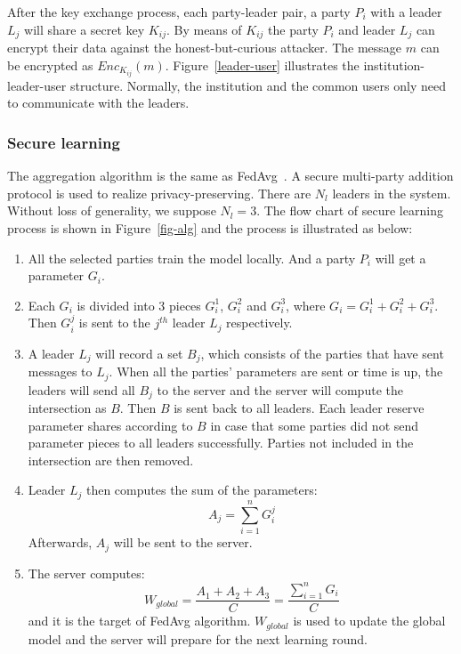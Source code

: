 After the key exchange process, each party-leader pair, a party $P_i$ with a leader $L_j$ will share a secret key $K_{ij}$. By means of $K_{ij}$ the party $P_i$ and leader $L_j$ can encrypt their data against the honest-but-curious attacker. The message $m$ can be encrypted as $Enc_{K_{ij}}(m)$. Figure~\ref{leader-user} illustrates the institution-leader-user structure. Normally, the institution and the common users only need to communicate with the leaders.

\subsubsection{\textbf{Secure learning}}
The aggregation algorithm is the same as FedAvg~\cite{mcmahan2016communicationefficient}. A secure multi-party addition protocol is used to realize privacy-preserving. There are $N_l$ leaders in the system. Without loss of generality, we suppose $N_l = 3$. The flow chart of secure learning process is shown in Figure~\ref{fig-alg} and the process is illustrated as below:

\begin{enumerate}
    \item All the selected parties train the model locally. And a party $P_i$ will get a parameter $G_i$.
    
    \item Each $G_i$ is divided into 3 pieces $G_i^1$, $G_i^2$ and $G_i^3$, where $G_i = G_i^1 + G_i^2 + G_i^3$. Then $G_i^j$ is sent to the $j^{th}$ leader $L_j$ respectively.
    
    \item A leader $L_j$ will record a set $B_j$, which consists of the parties that have sent messages to $L_j$. When all the parties' parameters are sent or time is up, the leaders will send all $B_j$ to the server and the server will compute the intersection as $B$. Then $B$ is sent back to all leaders. Each leader reserve parameter shares according to $B$ in case that some parties did not send parameter pieces to all leaders successfully. Parties not included in the intersection are then removed. 

    \item Leader $L_j$ then computes the sum of the parameters:
    $$A_j = \sum_{i=1}^nG_i^j$$ 
    Afterwards, $A_j$ will be sent to the server.

    \item The server computes: 
    $$W_{global} = \frac{A_1 + A_2 + A_3}{C}  = \frac{\sum_{i=1}^nG_i}{C} $$ 
    and it is the target of FedAvg algorithm. $W_{global}$ is used to update the global model and the server will prepare for the next learning round.
\end{enumerate}

